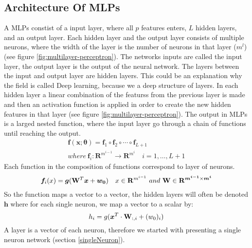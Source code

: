 \subsection{Architecture Of MLPs}
A MLPs constist of a input layer, where all $p$ features enters, $L$ hidden layers, and an output layer. Each hidden layer and the output layer consists of multiple neurons, where the width of the layer is the number of neurons in that layer ($m^l$) (see figure \ref{fig:multilayer-perceptron}). The networks inputs are called the input layer, the output layer is the output of the neural network. The layers between the input and output layer are hidden layers. This could be an explanation why the field is called Deep learning, because we a deep structure of layers. In each hidden layer a linear combination of the featurss from the previous layer is made and then an activation function is applied in order to create the new hidden features in that layer (see figure \ref{fig:multilayer-perceptron}). The output in MLPs is a larged nested function, where the input layer go through a chain of functions until reaching the output.
\begin{align}
\bm{f}(\bm{x};\bm{\theta})=\bm{f}_1 \circ \bm{f}_2 \circ \cdots \circ \bm{f}_{L+1}\\
where \ \bm{f}_i : \mathbf{R}^{m^{i-1}} \to \mathbf{R}^{m^{i}} \quad i=1,\ldots, L+1
\end{align}
Each function in the composition of functions correspond to layer of neurons.
\begin{align}
\bm{f}_i(x)=\bm{g}(\mathbf{W}^T \bm{x} + \bm{w_0}) \quad x\in \mathbf{R}^{m^{i-1}} \ and \ \mathbf{W} \in \mathbf{R}^{\bm{m^{i-1}} \times \bm{m^{i}} }
\end{align}
So the function maps a vector to a vector, the hidden layers will often be denoted $\bm{h}$ where for each single neuron, we map a vector to a scalar by:
$$h_i=g(\bm{x}^T \cdot \mathbf{W}_{:,i} + (w_0)_{i})$$
A layer is a vector of each neuron, therefore we started with presenting a single neuron network (section \ref{singleNeuron}).

